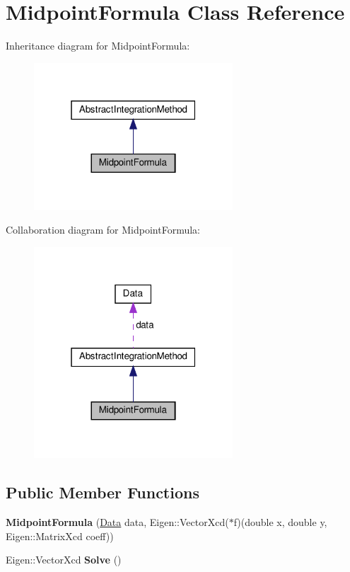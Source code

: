 \hypertarget{classMidpointFormula}{}\section{Midpoint\+Formula Class Reference}
\label{classMidpointFormula}


Inheritance diagram for Midpoint\+Formula\+:
\nopagebreak
\begin{figure}[H]
\begin{center}
\leavevmode
\includegraphics[width=211pt]{classMidpointFormula__inherit__graph}
\end{center}
\end{figure}


Collaboration diagram for Midpoint\+Formula\+:
\nopagebreak
\begin{figure}[H]
\begin{center}
\leavevmode
\includegraphics[width=211pt]{classMidpointFormula__coll__graph}
\end{center}
\end{figure}
\subsection*{Public Member Functions}
\begin{DoxyCompactItemize}
\item 
\mbox{\label{classMidpointFormula_ad3c444776b53996d50dbf88a61c36c8c}} 
{\bfseries Midpoint\+Formula} (\hyperlink{structData}{Data} data, Eigen\+::\+Vector\+Xcd($\ast$f)(double x, double y, Eigen\+::\+Matrix\+Xcd coeff))
\item 
\mbox{\label{classMidpointFormula_add437323dfb0bc181b0051c5aaf80ba7}} 
Eigen\+::\+Vector\+Xcd {\bfseries Solve} ()
\end{DoxyCompactItemize}
